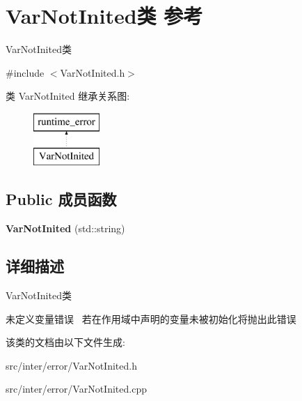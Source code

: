 \hypertarget{class_var_not_inited}{}\section{Var\+Not\+Inited类 参考}
\label{class_var_not_inited}


Var\+Not\+Inited类  




{\ttfamily \#include $<$Var\+Not\+Inited.\+h$>$}

类 Var\+Not\+Inited 继承关系图\+:\begin{figure}[H]
\begin{center}
\leavevmode
\includegraphics[height=2.000000cm]{class_var_not_inited}
\end{center}
\end{figure}
\subsection*{Public 成员函数}
\begin{DoxyCompactItemize}
\item 
{\bfseries Var\+Not\+Inited} (std\+::string)\hypertarget{class_var_not_inited_a14d78a6013df47440f2eba2074c1ef62}{}\label{class_var_not_inited_a14d78a6013df47440f2eba2074c1ef62}

\end{DoxyCompactItemize}


\subsection{详细描述}
Var\+Not\+Inited类 

未定义变量错误~\newline
若在作用域中声明的变量未被初始化将抛出此错误 

该类的文档由以下文件生成\+:\begin{DoxyCompactItemize}
\item 
src/inter/error/Var\+Not\+Inited.\+h\item 
src/inter/error/Var\+Not\+Inited.\+cpp\end{DoxyCompactItemize}
